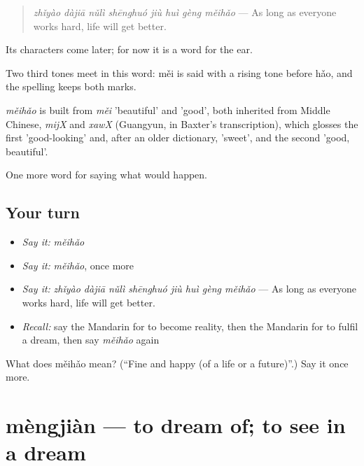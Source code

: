 \begin{quote}
\emph{zhǐyào dàjiā nǔlì shēnghuó jiù huì gèng měihǎo} — As long as everyone works hard, life will get better.
\end{quote}

Its characters come later; for now it is a word for the ear.

Two third tones meet in this word: měi is said with a rising tone before hǎo, and the spelling keeps both marks.

\begin{cousinweb}
\emph{měihǎo} is built from \emph{měi} 'beautiful' and  'good', both inherited from Middle Chinese, \emph{mijX} and \emph{xawX} (Guangyun, in Baxter's transcription), which glosses the first 'good-looking' and, after an older dictionary, 'sweet', and the second 'good, beautiful'.
\end{cousinweb}

\begin{grammarlens}[title={What you've built}]
One more word for saying what would happen.
\end{grammarlens}

\subsection*{Your turn}
\begin{itemize}
\raggedright
  \item \emph{Say it:} \emph{měihǎo}
  \item \emph{Say it:} \emph{měihǎo}, once more
  \item \emph{Say it:} \emph{zhǐyào dàjiā nǔlì shēnghuó jiù huì gèng měihǎo} — As long as everyone works hard, life will get better.
  \item \emph{Recall:} say the Mandarin for to become reality, then the Mandarin for to fulfil a dream, then say \emph{měihǎo} again
\end{itemize}

\begin{tcolorbox}[breakable,colback=teal!4,colframe=teal!35!black,title={Before you move on}]
What does měihǎo mean? (\textquotedblleft{}Fine and happy (of a life or a future)\textquotedblright{}.) Say it once more.
\end{tcolorbox}
\section[mèngjiàn]{mèngjiàn — to dream of; to see in a dream}

